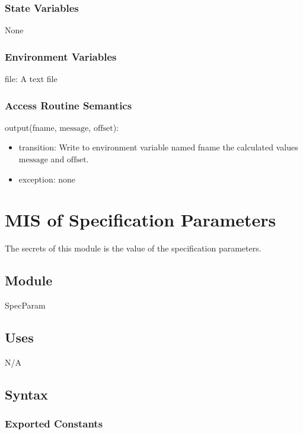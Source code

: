 \documentclass[12pt, titlepage]{article}
\begin{document}
\subsubsection{State Variables}

None

\subsubsection{Environment Variables}

file: A text file

\subsubsection{Access Routine Semantics}

\noindent output(fname, $\text{message}$, $\text{offset}$):
\begin{itemize}
\item transition:  Write to environment variable named fname the calculated values $\text{message}$ and $\text{offset}$.
\item exception: none
\end{itemize}

\newpage

\section{MIS of Specification Parameters} \label{SpecParam}

The secrets of this module is the value of the specification parameters.

\subsection{Module}

SpecParam

\subsection{Uses}

N/A

\subsection{Syntax}

\subsubsection{Exported Constants}
\end{document}

